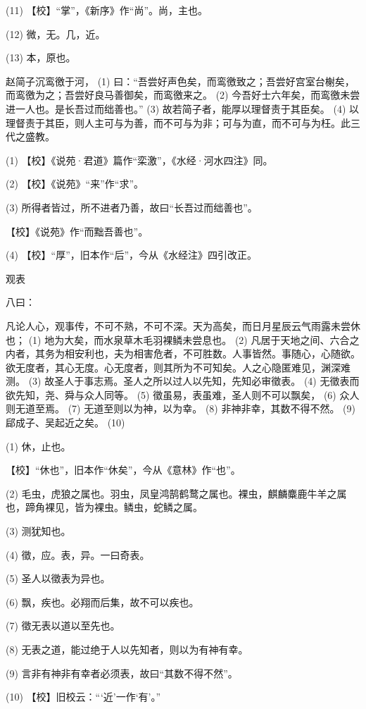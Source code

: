 \documentclass[12pt,UTF8]{ctexbook}
\begin{document}
(11) 【校】“掌”，《新序》作“尚”。尚，主也。

(12) 微，无。几，近。

(13) 本，原也。

赵简子沉鸾徼于河， (1) 曰：“吾尝好声色矣，而鸾徼致之；吾尝好宫室台榭矣，而鸾徼为之；吾尝好良马善御矣，而鸾徼来之。 (2) 今吾好士六年矣，而鸾徼未尝进一人也。是长吾过而绌善也。” (3) 故若简子者，能厚以理督责于其臣矣。 (4) 以理督责于其臣，则人主可与为善，而不可与为非；可与为直，而不可与为枉。此三代之盛教。

(1) 【校】《说苑·君道》篇作“栾激”，《水经·河水四注》同。

(2) 【校】《说苑》“来”作“求”。

(3) 所得者皆过，所不进者乃善，故曰“长吾过而绌善也”。

【校】《说苑》作“而黜吾善也”。

(4) 【校】“厚”，旧本作“后”，今从《水经注》四引改正。





观表


八曰：

凡论人心，观事传，不可不熟，不可不深。天为高矣，而日月星辰云气雨露未尝休也； (1) 地为大矣，而水泉草木毛羽裸鳞未尝息也。 (2) 凡居于天地之间、六合之内者，其务为相安利也，夫为相害危者，不可胜数。人事皆然。事随心，心随欲。欲无度者，其心无度。心无度者，则其所为不可知矣。人之心隐匿难见，渊深难测。 (3) 故圣人于事志焉。圣人之所以过人以先知，先知必审徵表。 (4) 无徵表而欲先知，尧、舜与众人同等。 (5) 徵虽易，表虽难，圣人则不可以飘矣， (6) 众人则无道至焉。 (7) 无道至则以为神，以为幸。 (8) 非神非幸，其数不得不然。 (9) 郈成子、吴起近之矣。 (10)

(1) 休，止也。

【校】“休也”，旧本作“休矣”，今从《意林》作“也”。

(2) 毛虫，虎狼之属也。羽虫，凤皇鸿鹄鹤鹜之属也。裸虫，麒麟麋鹿牛羊之属也，蹄角裸见，皆为裸虫。鳞虫，蛇鳞之属。

(3) 测犹知也。

(4) 徵，应。表，异。一曰奇表。

(5) 圣人以徵表为异也。

(6) 飘，疾也。必翔而后集，故不可以疾也。

(7) 徵无表以道以至先也。

(8) 无表之道，能过绝于人以先知者，则以为有神有幸。

(9) 言非有神非有幸者必须表，故曰“其数不得不然”。

(10) 【校】旧校云：“‘近’一作‘有’。”
\end{document}
